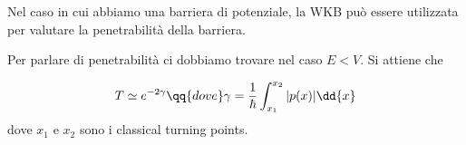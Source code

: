 Nel caso in cui abbiamo una barriera di potenziale, la WKB può essere utilizzata per valutare la penetrabilità della barriera.

Per parlare di penetrabilità ci dobbiamo trovare nel caso $E<V$. Si attiene che

\begin{equation*}
   T \simeq e^{-2\gamma}
   \qq{dove}
   \gamma=\frac{1}{\hbar} \int_{x_1}^{x_2} |p(x)| \dd{x}
\end{equation*}
dove $x_1$ e $x_2$ sono i classical turning points.

